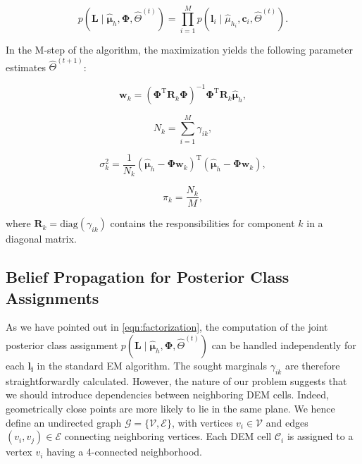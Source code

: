 \begin{equation}
\label{eqn:factorization}
p(\mathbf{L}\mid\hat{\boldsymbol\mu}_h,\boldsymbol{\Phi},\hat{\Theta}^{(t)})
=\prod_{i=1}^M p(\mathbf{l}_i\mid\hat{\mu}_{h_i},\mathbf{c}_i,
\hat{\Theta}^{(t)}).
\end{equation}

In the M-step of the algorithm, the maximization yields the following parameter
estimates $\hat{\Theta}^{(t+1)}$:

\begin{equation}
\label{eqn:coeff}
\mathbf{w}_k = (\boldsymbol{\Phi}^\text{T}\mathbf{R}_k\boldsymbol{\Phi})^{-1}
\boldsymbol{\Phi}^\text{T}\mathbf{R}_k\hat{\boldsymbol\mu}_h,
\end{equation}

\begin{equation}
\label{eqn:numpoints}
N_k = \sum_{i=1}^M\gamma_{ik},
\end{equation}

\begin{equation}
\label{eqn:var}
\sigma^2_k = \frac{1}{N_k}(\hat{\boldsymbol\mu}_h-\boldsymbol{\Phi}
\mathbf{w}_k)^\text{T}(\hat{\boldsymbol\mu}_h-\boldsymbol{\Phi}\mathbf{w}_k),
\end{equation}

\begin{equation}
\label{eqn:weights}
\pi_k = \frac{N_k}{M},
\end{equation}

where $\mathbf{R}_k=\text{diag}(\gamma_{ik})$ contains the responsibilities for
component $k$ in a diagonal matrix.

\subsection{Belief Propagation for Posterior Class Assignments}
As we have pointed out in \eqref{eqn:factorization}, the computation of the
joint posterior class assignment
$p(\mathbf{L}\mid\hat{\boldsymbol\mu}_h,\boldsymbol{\Phi},\hat{\Theta}^{(t)})$
can be handled independently for each $\mathbf{l_i}$ in the standard EM
algorithm. The sought marginals $\gamma_{ik}$ are therefore straightforwardly
calculated. However, the nature of our problem suggests that we should introduce
dependencies between neighboring DEM cells. Indeed, geometrically close points
are more likely to lie in the same plane. We hence define an undirected graph
$\mathcal{G}=\{\mathcal{V},\mathcal{E}\}$, with vertices $v_i\in\mathcal{V}$ and
edges $(v_i,v_j)\in\mathcal{E}$ connecting neighboring vertices. Each DEM cell
$\mathcal{C}_i$ is assigned to a vertex $v_i$ having a 4-connected neighborhood.

